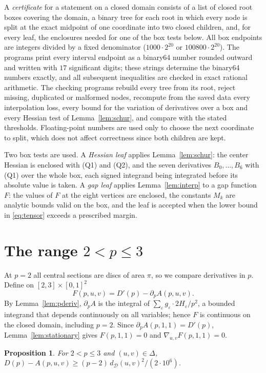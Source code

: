 \documentclass[11pt]{amsart}
\newtheorem{proposition}[theorem]{Proposition}
\theoremstyle{definition}
\theoremstyle{remark}
\numberwithin{equation}{section}
\newcommand{\cD}{\mathcal{D}}
\newcommand{\ve}{\varepsilon}
\begin{document}
A \emph{certificate} for a statement on a closed domain consists of a list of closed root boxes covering the domain, a binary tree for each root in which every node is split at the exact midpoint of one coordinate into two closed children, and, for every leaf, the enclosures needed for one of the box tests below. All box endpoints are integers divided by a fixed denominator ($1000\cdot2^{20}$ or $100800\cdot2^{20}$). The programs print every interval endpoint as a binary64 number rounded outward and written with $17$ significant digits; these strings determine the binary64 numbers exactly, and all subsequent inequalities are checked in exact rational arithmetic. The checking programs rebuild every tree from its root, reject missing, duplicated or malformed nodes, recompute from the saved data every interpolation loss, every bound for the variation of derivatives over a box and every Hessian test of Lemma~\ref{lem:schur}, and compare with the stated thresholds. Floating-point numbers are used only to choose the next coordinate to split, which does not affect correctness since both children are kept.

Two box tests are used. A \emph{Hessian leaf} applies Lemma~\ref{lem:schur}: the center Hessian is enclosed with (Q1) and (Q2), and the seven derivatives $B_0,\dots,B_6$ with (Q1) over the whole box, each signed integrand being integrated before its absolute value is taken. A \emph{gap leaf} applies Lemma~\ref{lem:interp} to a gap function $F$: the values of $F$ at the eight vertices are enclosed, the constants $M_k$ are analytic bounds valid on the box, and the leaf is accepted when the lower bound in \eqref{eq:tensor} exceeds a prescribed margin.

\section{The range \texorpdfstring{$2<p\le3$}{2<p<=3}}\label{sec:near2}

At $p=2$ all central sections are discs of area $\pi$, so we compare derivatives in $p$. Define on $[2,3]\times[0,1]^2$
\[
F(p,u,v)=D'(p)-\partial_pA(p,u,v).
\]
By Lemma~\ref{lem:pderiv}, $\partial_pA$ is the integral of $\sum_\ve g_\ve\cdot 2H_\ve/p^2$, a bounded integrand that depends continuously on all variables; hence $F$ is continuous on the closed domain, including $p=2$. Since $\partial_pA(p,1,1)=D'(p)$, Lemma~\ref{lem:stationary} gives $F(p,1,1)=0$ and $\nabla_{u,v}F(p,1,1)=0$.

\begin{proposition}\label{prop:near2}
For $2<p\le3$ and $(u,v)\in\Delta$, $D(p)-A(p,u,v)\ge (p-2)\,d_\cD(u,v)^2/(2\cdot10^6)$.
\end{proposition}
\end{document}
